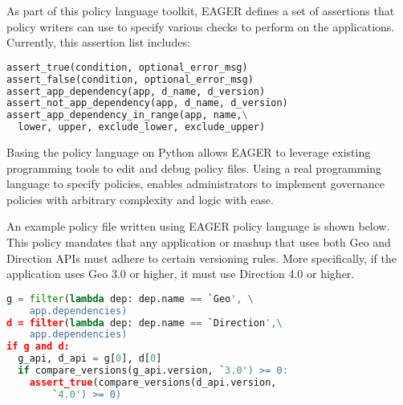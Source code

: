 As part of this policy language toolkit, EAGER
defines a set of assertions that policy writers can use to specify various 
checks to perform on the applications. 
Currently, this assertion list includes:

\vspace{0.05in}
{\footnotesize 
\begin{lstlisting}[language=Python, frame=single]
assert_true(condition, optional_error_msg)
assert_false(condition, optional_error_msg)
assert_app_dependency(app, d_name, d_version)
assert_not_app_dependency(app, d_name, d_version)
assert_app_dependency_in_range(app, name,\
  lower, upper, exclude_lower, exclude_upper)
\end{lstlisting}
}


Basing the policy language on Python allows EAGER to leverage
existing programming tools to edit and debug policy files. Using a real programming 
language to specify policies, enables administrators to implement governance policies with
arbitrary complexity and logic with ease. 

An example policy file written using EAGER
policy language is shown below. 
This policy mandates that any application or mashup
that uses both Geo and Direction APIs must adhere to certain versioning 
rules. More specifically, if the application uses Geo 3.0 or higher, it must use
Direction 4.0 or higher.

\vspace{0.05in}
{\footnotesize
\begin{lstlisting}[language=Python, frame=single, showstringspaces=false]
g = filter(lambda dep: dep.name == `Geo', \
	app.dependencies)
d = filter(lambda dep: dep.name == `Direction',\
	app.dependencies)
if g and d:
  g_api, d_api = g[0], d[0]
  if compare_versions(g_api.version, `3.0') >= 0:
    assert_true(compare_versions(d_api.version, 
    	`4.0') >= 0)
\end{lstlisting}
}
\vspace{0.05in}

